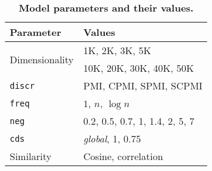 \begin{table}
  \centering
  \small
  \begin{tabular}{ll}
    \toprule
    Parameter & Values \\
    \midrule
    \multirow{2}{*}{Dimensionality} & 1K, 2K, 3K, 5K \\
                                    & 10K, 20K, 30K, 40K, 50K \\
    \texttt{discr} & PMI, CPMI, SPMI, SCPMI \\
    \texttt{freq} & $1$, $n$, $\log n$ \\
    \texttt{neg} & 0.2, 0.5, 0.7, 1, 1.4, 2, 5, 7 \\
    \texttt{cds} & \textit{global}, 1, 0.75 \\
    Similarity & Cosine, correlation \\
    \bottomrule
  \end{tabular}
  \caption{\textbf{Model parameters and their values.}}
\label{tab:parameters}
\end{table}


